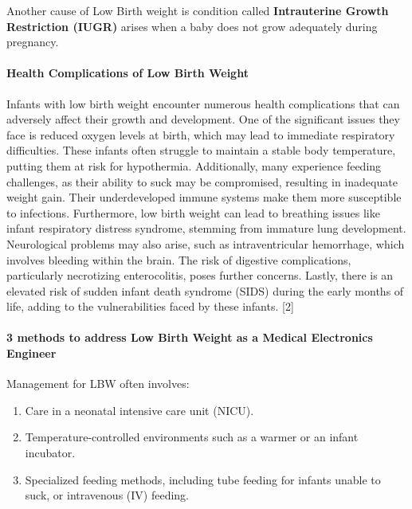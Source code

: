 \documentclass{article}
\begin{document}
Another cause of Low Birth weight is condition called
\textbf{Intrauterine Growth Restriction (IUGR)} arises when a baby does
not grow adequately during pregnancy.

\paragraph{Health Complications of Low Birth
Weight}\label{health-complications-of-low-birth-weight}

Infants with low birth weight encounter numerous health complications
that can adversely affect their growth and development. One of the
significant issues they face is reduced oxygen levels at birth, which
may lead to immediate respiratory difficulties. These infants often
struggle to maintain a stable body temperature, putting them at risk for
hypothermia. Additionally, many experience feeding challenges, as their
ability to suck may be compromised, resulting in inadequate weight gain.
Their underdeveloped immune systems make them more susceptible to
infections. Furthermore, low birth weight can lead to breathing issues
like infant respiratory distress syndrome, stemming from immature lung
development. Neurological problems may also arise, such as
intraventricular hemorrhage, which involves bleeding within the brain.
The risk of digestive complications, particularly necrotizing
enterocolitis, poses further concerns. Lastly, there is an elevated risk
of sudden infant death syndrome (SIDS) during the early months of life,
adding to the vulnerabilities faced by these infants. {[}2{]}

\paragraph{3 methods to address Low Birth Weight as a Medical
Electronics
Engineer}\label{methods-to-address-low-birth-weight-as-a-medical-electronics-engineer}

Management for LBW often involves:

\begin{enumerate}
\def\labelenumi{\arabic{enumi}.}
\item
  Care in a neonatal intensive care unit (NICU).
\item
  Temperature-controlled environments such as a warmer or an infant
  incubator.
\item
  Specialized feeding methods, including tube feeding for infants unable
  to suck, or intravenous (IV) feeding.
\end{enumerate}
\end{document}
